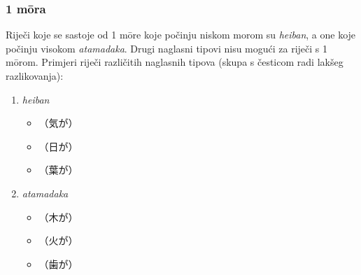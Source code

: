 \subsubsection*{1 m\=ora}
Riječi koje se sastoje od 1 m\=ore koje počinju niskom morom su \textit{heiban}, a one koje počinju visokom \textit{atamadaka}.
Drugi naglasni tipovi nisu mogući za riječi s 1 m\=orom.
Primjeri riječi različitih naglasnih tipova (skupa s česticom radi lakšeg razlikovanja):
\begin{enumerate}
	\item \textit{heiban}
	\begin{multicols}{3}
		\begin{itemize}
			\item {}（気が）
			\item {}（日が）
			\item {}（葉が）
		\end{itemize}
	\end{multicols}
	\item \textit{atamadaka}
	\begin{multicols}{3}
		\begin{itemize}
			\item {}（木が）
			\item {}（火が）
			\item {}（歯が）
		\end{itemize}
	\end{multicols}
\end{enumerate}

